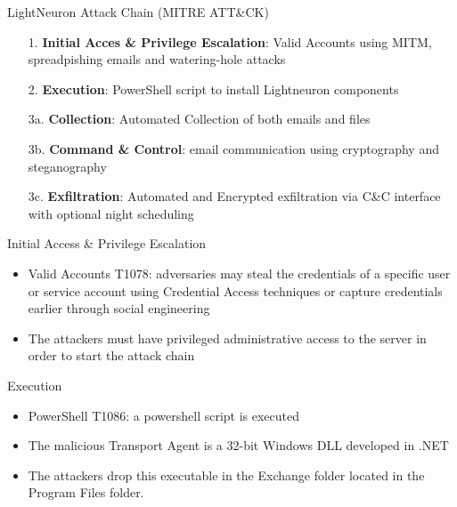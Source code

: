 \begin{frame}[fragile]{LightNeuron Attack Chain (MITRE ATT\&CK)}
    
    \begin{enumerate}
        \item[1.] \textbf{Initial Acces \& Privilege Escalation}: Valid Accounts using MITM, spreadpishing emails and watering-hole attacks
        \item[2.] \textbf{Execution}: PowerShell script to install Lightneuron components
        \item[3a.] \textbf{Collection}: Automated Collection of both emails and files
        \item[3b.] \textbf{Command \& Control}: email communication using cryptography and steganography
        \item[3c.] \textbf{Exfiltration}: Automated and Encrypted exfiltration via C\&C interface with optional night scheduling
    \end{enumerate}
\end{frame}

\begin{frame}[fragile]{Initial Access \& Privilege Escalation}
    \begin{itemize}
        \item Valid Accounts T1078: adversaries may steal the credentials of a 
        specific user or service account using Credential Access techniques
         or capture credentials earlier through social engineering \cite{MitreTechniques}
        \item The attackers must have privileged administrative access to 
        the server in order to start the attack chain 
    \end{itemize}
\end{frame}

\begin{frame}[fragile]{Execution}
    \begin{itemize}
        \item PowerShell T1086: a powershell script is executed
        \item The malicious Transport Agent is a 32-bit Windows DLL developed in .NET
        \item The attackers drop this executable in the Exchange folder located in the 
        Program Files folder.  
    \end{itemize}
\end{frame}

